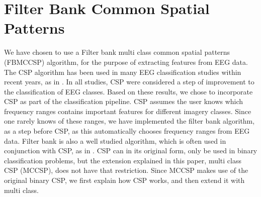 \section{Filter Bank Common Spatial Patterns}
We have chosen to use a Filter bank multi class common spatial patterns (FBMCCSP) algorithm, for the purpose of extracting features from EEG data. The CSP algorithm has been used in many EEG classification studies within recent years, as in \cite{ang2012filter}. In all studies, CSP were considered a step of improvement to the classification of EEG classes. Based on these results, we chose to incorporate CSP as part of the classification pipeline. CSP assumes the user knows which frequency ranges contains important features for different imagery classes. Since one rarely knows of these ranges, we have implemented the filter bank algorithm, as a step before CSP, as this automatically chooses frequency ranges from EEG data. Filter bank is also a well studied algorithm, which is often used in conjunction with CSP, as in \cite{ang2008filter}. CSP can in its original form, only be used in binary classification problems, but the extension explained in this paper, multi class CSP (MCCSP), does not have that restriction. Since MCCSP makes use of the original binary CSP, we first explain how CSP works, and then extend it with multi class.

